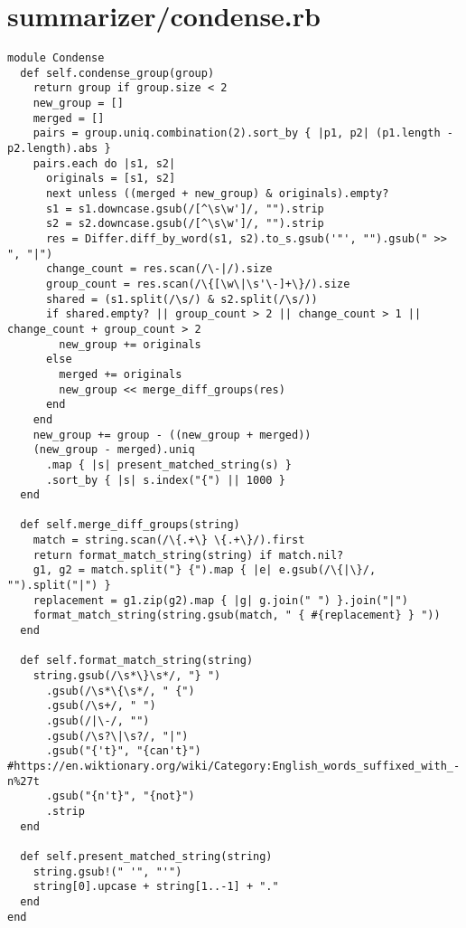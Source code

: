 \documentclass{article}
\begin{document}
\section*{summarizer/condense.rb}
\begin{verbatim}
module Condense
  def self.condense_group(group)
    return group if group.size < 2
    new_group = []
    merged = []
    pairs = group.uniq.combination(2).sort_by { |p1, p2| (p1.length - p2.length).abs }
    pairs.each do |s1, s2|
      originals = [s1, s2]
      next unless ((merged + new_group) & originals).empty?
      s1 = s1.downcase.gsub(/[^\s\w']/, "").strip
      s2 = s2.downcase.gsub(/[^\s\w']/, "").strip
      res = Differ.diff_by_word(s1, s2).to_s.gsub('"', "").gsub(" >> ", "|")
      change_count = res.scan(/\-|/).size
      group_count = res.scan(/\{[\w\|\s'\-]+\}/).size
      shared = (s1.split(/\s/) & s2.split(/\s/))
      if shared.empty? || group_count > 2 || change_count > 1 || change_count + group_count > 2
        new_group += originals
      else
        merged += originals
        new_group << merge_diff_groups(res)
      end
    end
    new_group += group - ((new_group + merged))
    (new_group - merged).uniq
      .map { |s| present_matched_string(s) }
      .sort_by { |s| s.index("{") || 1000 }
  end

  def self.merge_diff_groups(string)
    match = string.scan(/\{.+\} \{.+\}/).first
    return format_match_string(string) if match.nil?
    g1, g2 = match.split("} {").map { |e| e.gsub(/\{|\}/, "").split("|") }
    replacement = g1.zip(g2).map { |g| g.join(" ") }.join("|")
    format_match_string(string.gsub(match, " { #{replacement} } "))
  end

  def self.format_match_string(string)
    string.gsub(/\s*\}\s*/, "} ")
      .gsub(/\s*\{\s*/, " {")
      .gsub(/\s+/, " ")
      .gsub(/|\-/, "")
      .gsub(/\s?\|\s?/, "|")
      .gsub("{'t}", "{can't}") #https://en.wiktionary.org/wiki/Category:English_words_suffixed_with_-n%27t
      .gsub("{n't}", "{not}")
      .strip
  end

  def self.present_matched_string(string)
    string.gsub!(" '", "'")
    string[0].upcase + string[1..-1] + "."
  end
end


\end{verbatim}
\pagebreak
\end{document}
